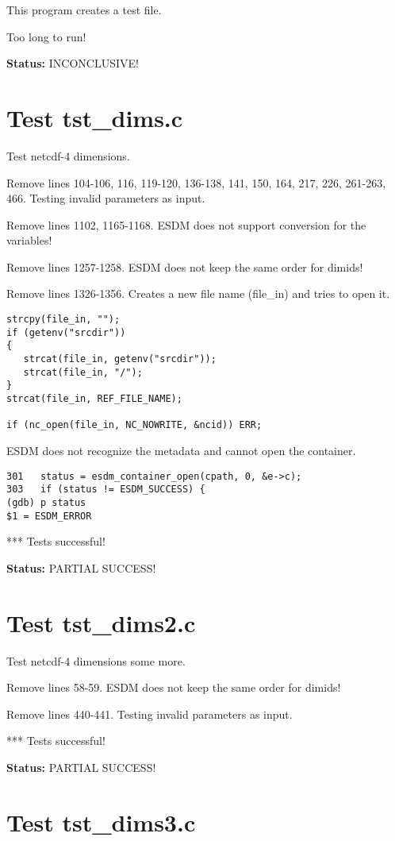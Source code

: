 This program creates a test file.

Too long to run!

{\bf \large Status: } INCONCLUSIVE!

\section{Test tst\_dims.c}

Test netcdf-4 dimensions.

Remove lines 104-106, 116, 119-120, 136-138, 141, 150, 164, 217, 226, 261-263, 466. Testing invalid parameters as input.

Remove lines 1102, 1165-1168. ESDM does not support conversion for the variables!

Remove lines 1257-1258. ESDM does not keep the same order for dimids!

Remove lines 1326-1356. Creates a new file name (file\_in) and tries to open it.

\begin{verbatim}
strcpy(file_in, "");
if (getenv("srcdir"))
{
   strcat(file_in, getenv("srcdir"));
   strcat(file_in, "/");
}
strcat(file_in, REF_FILE_NAME);

if (nc_open(file_in, NC_NOWRITE, &ncid)) ERR;
\end{verbatim}

ESDM does not recognize the metadata and cannot open the container.

\begin{verbatim}
301	  status = esdm_container_open(cpath, 0, &e->c);
303	  if (status != ESDM_SUCCESS) {
(gdb) p status
$1 = ESDM_ERROR
\end{verbatim}

*** Tests successful!

{\bf \large Status: } PARTIAL SUCCESS!

\section{Test tst\_dims2.c}

Test netcdf-4 dimensions some more.

Remove lines 58-59. ESDM does not keep the same order for dimids!

Remove lines 440-441. Testing invalid parameters as input.

*** Tests successful!

{\bf \large Status: } PARTIAL SUCCESS!

\section{Test tst\_dims3.c}

